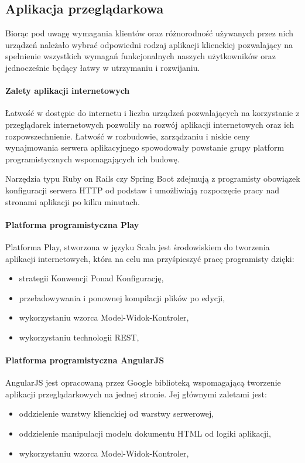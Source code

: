 \documentclass[a4paper,12pt,twoside]{article}
\begin{document}
\subsection{Aplikacja przeglądarkowa}
Biorąc pod uwagę wymagania klientów oraz różnorodność używanych przez nich urządzeń należało wybrać odpowiedni rodzaj aplikacji klienckiej pozwalający na spełnienie wszystkich wymagań funkcjonalnych naszych użytkowników
oraz jednocześnie będący łatwy w utrzymaniu i rozwijaniu.

\paragraph{Zalety aplikacji internetowych}
Łatwość w dostępie do internetu i liczba urządzeń pozwalających na
korzystanie z przeglądarek internetowych pozwoliły
na rozwój aplikacji internetowych oraz ich rozpowszechnienie.
Łatwość w rozbudowie, zarządzaniu i
niskie ceny wynajmowania serwera aplikacyjnego spowodowały
powstanie grupy platform programistycznych wspomagających ich budowę.

Narzędzia typu Ruby on Rails czy Spring Boot
zdejmują z programisty obowiązek konfiguracji serwera
HTTP od podstaw i umożliwiają rozpoczęcie pracy
nad stronami aplikacji po kilku minutach.

\paragraph{Platforma programistyczna Play}
Platforma Play, stworzona w języku Scala jest środowiskiem
do tworzenia aplikacji internetowych,
która na celu ma przyśpieszyć pracę programisty dzięki:
\begin{itemize}
\item strategii Konwencji Ponad Konfigurację,
\item przeładowywania i ponownej kompilacji plików po edycji,
\item wykorzystaniu wzorca Model-Widok-Kontroler,
\item wykorzystaniu technologii REST,
\end{itemize}

\paragraph{Platforma programistyczna AngularJS}
AngularJS jest opracowaną przez Google biblioteką wspomagającą tworzenie
aplikacji przeglądarkowych na jednej stronie. Jej głównymi zaletami jest:
\begin{itemize}
\item oddzielenie warstwy klienckiej od warstwy serwerowej,
\item oddzielenie manipulacji modelu dokumentu HTML od logiki aplikacji,
\item wykorzystaniu wzorca Model-Widok-Kontroler,
\end{itemize}
\end{document}
